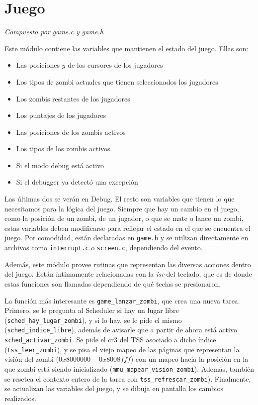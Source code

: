 \documentclass{article}
\begin{document}
	\section{Juego}
	\vspace{-1cm}
	\begin{flushright}
	\textit{Compuesto por game.c y game.h}
	\end{flushright}

	Este módulo contiene las variables que mantienen el estado del juego. Ellas son:

	\begin{itemize}[topsep=0pt]
		\item Las posiciones $y$ de los cursores de los jugadores
		\item Los tipos de zombi actuales que tienen seleccionados los jugadores
		\item Los zombis restantes de los jugadores
		\item Los puntajes de los jugadores
		\item Las posiciones de los zombis activos
		\item Los tipos de los zombis activos
		\item Si el modo debug está activo
		\item Si el debugger ya detectó una excepción
	\end{itemize}

	Las últimas dos se verán en Debug. El resto son variables que tienen lo que necesitamos para la lógica del juego. Siempre que hay un cambio en el juego, como la posición de un zombi, de un jugador, o que se mate o lance un zombi, estas variables deben modificarse para reflejar el estado en el que se encuentra el juego. Por comodidad, están declaradas en \texttt{game.h} y se utilizan directamente en archivos como \texttt{interrupt.c} o \texttt{screen.c}, dependiendo del evento.

	Además, este módulo provee rutinas que representan las diversas acciones dentro del juego. Están íntimamente relacionadas con la \textit{isr} del teclado, que es de donde estas funciones son llamadas dependiendo de qué teclas se presionaron.

	La función más interesante es \texttt{game\_lanzar\_zombi}, que crea una nueva tarea.  Primero, se le pregunta al Scheduler si hay un lugar libre (\texttt{sched\_hay\_lugar\_zombi}), y si lo hay, se le pide el mismo (\texttt{sched\_indice\_libre}), además de avisarle que a partir de ahora está activo \texttt{sched\_activar\_zombi}. Se pide el cr3 del TSS asociado a dicho índice (\texttt{tss\_leer\_zombi}), y se pisa el viejo mapeo de las páginas que representan la visión del zombi ($0x8000000 - 0x8008fff$) con un mapeo hacia la posición en la que zombi está siendo inicializado (\texttt{mmu\_mapear\_vision\_zombi}). Además, también se resetea el contexto entero de la tarea con \texttt{tss\_refrescar\_zombi}). Finalmente, se actualizan las variables del juego, y se dibuja en pantalla los cambios realizados.
\end{document}
